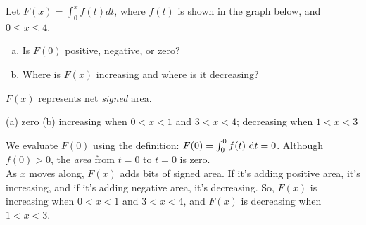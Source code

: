 \begin{Mquestion}\label{1.1_intpic1}
Let $F(x) = \displaystyle\int_0^x f(t)dt$, where $f(t)$ is shown in the graph below, and $0 \leq x \leq 4$.
\begin{enumerate}[(a)]
\item Is $F(0)$ positive, negative, or zero?
\item Where is $F(x)$ increasing and where is it decreasing?
\end{enumerate}
\begin{center}
\end{center}
\end{Mquestion}
\begin{hint}
$F(x)$ represents net \emph{signed} area.
\end{hint}
\begin{answer}
(a) zero \qquad (b) increasing when $0 < x < 1$ and $3<x<4$; decreasing when $1<x<3$
\end{answer}
\begin{solution}
We evaluate $F(0)$ using the definition: $F(0) = \int_0^0 f(t)\ \dee{t}=0$. Although $f(0)>0$, the \emph{area} from $t=0$ to $t=0$ is zero.\\
As $x$ moves along, $F(x)$ adds bits of signed area. If it's adding positive area, it's increasing, and if it's adding negative area, it's decreasing. So, $F(x)$ is increasing when $0 < x < 1$ and $3<x<4$, and $F(x)$ is decreasing when $1<x<3$.
\end{solution}

